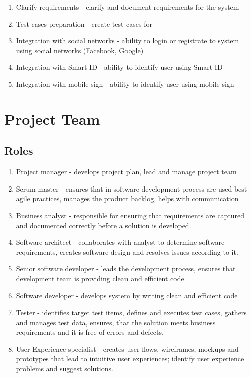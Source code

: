 \documentclass{VUMIFPSkursinis}
\begin{document}
\begin{enumerate}
		\item{Clarify requirements} - clarify and document requirements for the system
		\item{Test cases preparation} - create test cases for 
		\item{Integration with social networks} - ability to login or registrate to system using social networks (Facebook, Google)
		\item{Integration with Smart-ID} - ability to identify user using Smart-ID
		\item{Integration with mobile sign} - ability to identify user using mobile sign
	\end{enumerate}

\section{Project Team}
	\subsection{Roles}
	\begin{enumerate}
		\item{Project manager} - develops project plan, lead and manage project team
		\item{Scrum master} - ensures that in software development process are used best agile practices, manages the product backlog, helps with communication
		\item{Business analyst} - responsible for ensuring that requirements are captured and documented correctly before a solution is developed.
		\item{Software architect} - collaborates with analyst to determine software requirements, creates software design and resolves issues according to it.
		\item{Senior software developer} - leads the development process, ensures that development team is providing clean and efficient code
		\item{Software developer} - develops system by writing clean and efficient code
		\item{Tester} - identifies target test items, defines and executes test cases, gathers and manages test data, ensures, that the solution meets business requirements and it is free of errors and defects.
		\item{User Experience specialist} - creates user flows, wireframes, mockups and prototypes that lead to intuitive user experiences; identify user experience problems and suggest solutions.
	\end{enumerate}
	
\end{document}
